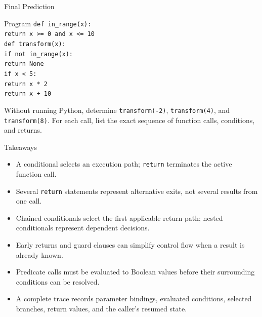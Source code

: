 \documentclass[aspectratio=169,10pt]{beamer}
\begin{document}
\begin{frame}{Final Prediction}
  \begin{block}{Program}
    \texttt{def in\_range(x):}\\
    \hspace*{0.20in}\texttt{return x >= 0 and x <= 10}\\[0.06in]
    \texttt{def transform(x):}\\
    \hspace*{0.20in}\texttt{if not in\_range(x):}\\
    \hspace*{0.40in}\texttt{return None}\\
    \hspace*{0.20in}\texttt{if x < 5:}\\
    \hspace*{0.40in}\texttt{return x * 2}\\
    \hspace*{0.20in}\texttt{return x + 10}
  \end{block}

  \begin{activity}
    Without running Python, determine \texttt{transform(-2)}, \texttt{transform(4)}, and \texttt{transform(8)}. For each call, list the exact sequence of function calls, conditions, and returns.
  \end{activity}
\end{frame}

\begin{frame}{Takeaways}
  \begin{itemize}
    \item A conditional selects an execution path; \texttt{return} terminates the active function call.
    \item Several \texttt{return} statements represent alternative exits, not several results from one call.
    \item Chained conditionals select the first applicable return path; nested conditionals represent dependent decisions.
    \item Early returns and guard clauses can simplify control flow when a result is already known.
    \item Predicate calls must be evaluated to Boolean values before their surrounding conditions can be resolved.
    \item A complete trace records parameter bindings, evaluated conditions, selected branches, return values, and the caller's resumed state.
  \end{itemize}
\end{frame}
\end{document}
